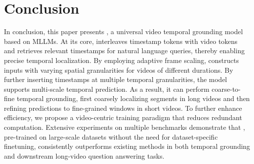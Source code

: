 \vspace{-5pt}
\section{Conclusion}

In conclusion, this paper presents \textbf{\Model{}}, a universal video temporal grounding model based on MLLMs. At its core, \Model{} interleaves timestamp tokens with video tokens and retrieves relevant timestamps for natural language queries, thereby enabling precise temporal localization. 
By employing adaptive frame scaling, \Model{} constructs inputs with varying spatial granularities for videos of different durations. By further inserting timestamps at multiple temporal granularities, the model supports multi-scale temporal prediction. As a result, it can perform coarse-to-fine temporal grounding, first coarsely localizing segments in long videos and then refining predictions to fine-grained windows in short videos.
To further enhance efficiency, we propose a video-centric training paradigm that reduces redundant computation. Extensive experiments on multiple benchmarks demonstrate that \Model{}, pre-trained on large-scale datasets without the need for dataset-specific finetuning, consistently outperforms existing methods in both temporal grounding and downstream long-video question answering tasks.
